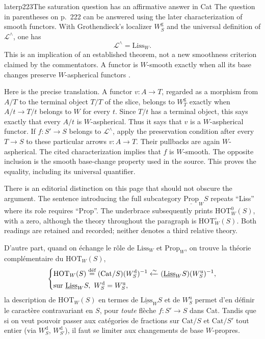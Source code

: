 \begin{dcomment}{later}{p223}{The saturation question has an affirmative answer in Cat}
The question in parentheses on p.~222 can be answered using the later characterization of smooth functors. With Grothendieck's localizer $W^{\mathrm g}_S$ and the universal definition of $\mathcal L^\wedge$, one has
\[
 \mathcal L^\wedge=\mathrm{Liss}_W.
\]
This is an implication of an established theorem, not a new smoothness criterion claimed by the commentators. A functor is $W$-smooth exactly when all its base changes preserve $W$-aspherical functors \citep[Theorem 1.2(c)]{Maltsiniotis2005Asphericite}.

Here is the precise translation. A functor $v:A\to T$, regarded as a morphism from $A/T$ to the terminal object $T/T$ of the slice, belongs to $W^{\mathrm g}_T$ exactly when $A/t\to T/t$ belongs to $W$ for every $t$. Since $T/t$ has a terminal object, this says exactly that every $A/t$ is $W$-aspherical. Thus it says that $v$ is a $W$-aspherical functor. If $f:S'\to S$ belongs to $\mathcal L^\wedge$, apply the preservation condition after every $T\to S$ to these particular arrows $v:A\to T$. Their pullbacks are again $W$-aspherical. The cited characterization implies that $f$ is $W$-smooth. The opposite inclusion is the smooth base-change property used in the source. This proves the equality, including its universal quantifier.

There is an editorial distinction on this page that should not obscure the argument. The sentence introducing the full subcategory $\underline{\mathrm{Prop}}_W S$ repeats ``Liss'' where its role requires ``Prop''. The underbrace subsequently prints $\mathrm{HOT}^{0}_W(S)$, with a zero, although the theory throughout the paragraph is $\mathrm{HOT}^{\circ}_W(S)$. Both readings are retained and recorded; neither denotes a third relative theory.
\end{dcomment}



D'autre part, quand on échange le rôle de $\mathrm{Liss}_W$ et $\mathrm{Prop}_W$, on trouve la théorie complémentaire du $\mathrm{HOT}_W(S)$,
\[
\left\{
\begin{aligned}
&\mathrm{HOT}_W(S) \deff (\mathrm{Cat}/S)(W^{\mathrm{d}}_S)^{-1} \xleftarrow{\sim} (\underline{\mathrm{Liss}}_W S)(W^{\mathrm{u}}_S)^{-1},\\
&\text{sur } \underline{\mathrm{Liss}}_W S,\ W^{\mathrm{d}}_S = W^{\mathrm{u}}_S,
\end{aligned}
\right.
\]
la description de $\mathrm{HOT}_W(S)$ en termes de $\underline{\mathrm{Liss}}_W S$ et de $W^{\mathrm{u}}_S$ permet d'en définir le caractère contravariant en $S$, pour \textit{toute} flèche $f : S' \longrightarrow S$ dans Cat. Tandis que si on veut pouvoir passer aux catégories de fractions sur $\mathrm{Cat}/S$ et $\mathrm{Cat}/S'$ tout entier (via $W^{\mathrm{d}}_S$, $W^{\mathrm{d}}_{S'}$), il faut se limiter aux changements de base $W$-propres.

